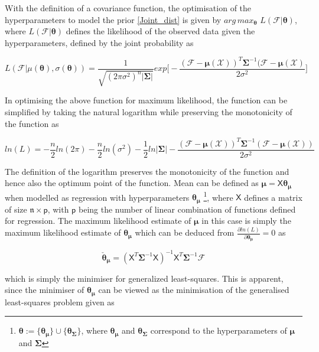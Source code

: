With the definition of a covariance function, the optimisation of the hyperparameters to model the prior \eqref{Joint_dist} is given by $arg \, max_{\bm\theta} \,\, L(\mathcal{F}|\bm\theta)$, where $L(\mathcal{F}|\bm\theta)$ defines the likelihood of the observed data given the hyperparameters, defined by the joint probability as

\begin{equation}
L(\mathcal{F}|\mu(\bm{\theta}),\sigma({\bm \theta}))= \frac{1}{\sqrt{(2\pi\sigma^2)^{n}|\bm\Sigma|}}exp\bigg[-\frac{(\mathcal{F}-\bm{\mu}(\mathcal{X}))^T\bm\Sigma^{-1}(\mathcal{F}-\bm{\mu}(\mathcal{X})}{2\sigma^2} \bigg] 
\end{equation}

In optimising the above function for maximum likelihood, the function can be simplified by taking the natural logarithm while preserving the monotonicity of the function as

\begin{equation}\label{ln_like}
 ln(L)=-\frac{n}{2}ln(2\pi)-\frac{n}{2}ln(\sigma^2)-\frac{1}{2} ln|\bm\Sigma|-\frac{(\mathcal{F}-\bm{\mu}(\mathcal{X}))^T\bm\Sigma^{-1}(\mathcal{F}-\bm{\mu}(\mathcal{X}))}{2\sigma^2}
 \end{equation}

The definition of the logarithm preserves the monotonicity of the function and hence also the optimum point of the function.
Mean can be defined as $\bm \mu = \mathsf{X}\bm \theta_{\bm \mu}$ when modelled as regression with hyperparameters $\bm \theta_{\bm \mu}$ \footnote{$\bm\theta:=\{ \bm\theta_{\bm \mu}\}\cup\{\bm \theta_{\bm \Sigma}\}$, where $\bm\theta_{\bm \mu}$ and $\bm \theta_{\bm \Sigma}$ correspond to the hyperparameters of $\bm \mu$ and $\bm \Sigma$}, where $\mathsf{X}$ defines a matrix of size $\mathfrak{n}\times\mathsf{p}$, with $\mathsf{p}$ being the number of linear combination of functions defined for regression. The maximum likelihood estimate of $ \bm \mu$ in this case is simply the maximum likelihood estimate of $\bm {\theta_{\bm \mu}}$ which can be deduced from $\frac{\partial ln(L)}{\partial \bm {\theta_{\bm \mu}}} =0$ as

\begin{equation}
\bm {\check{\theta}_{\bm \mu}}=(\mathsf{X}^T \bm\Sigma^{-1}\mathsf{X})^{-1}\mathsf{X}^T \bm\Sigma^{-1}\mathcal{F}
\end{equation} 

which is simply the minimiser for generalized least-squares. This is apparent, since the minimiser of $\bm {\theta_{\bm \mu}}$ can be viewed as the minimisation of the generalised least-squares problem given as

